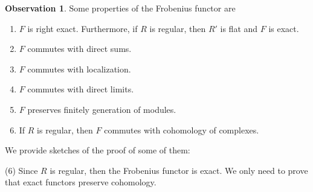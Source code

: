 \documentclass[leqno]{article}
\theoremstyle{definition}
\newtheorem{observation}{Observation}[section]
\begin{document}
\begin{observation} Some properties of the Frobenius functor are
\begin{enumerate}[topsep=-6pt, itemsep=0pt]
  \item $F$ is right exact. Furthermore, if $R$ is regular, then $R'$ is flat and  $F$ is exact.
  \item $F$ commutes with direct sums.
  \item $F$ commutes with localization.
  \item $F$ commutes with direct limits. 
  \item $F$ preserves finitely generation of modules.
  \item If $R$ is regular, then $F$ commutes with cohomology of complexes.
\end{enumerate}
We provide sketches of the proof of some of them:

(6) Since $R$ is regular, then the Frobenius functor is exact. We only need to prove that exact functors preserve cohomology.


\end{observation}
\end{document}
